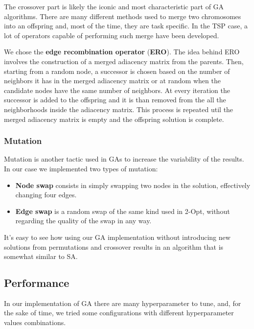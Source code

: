 The crossover part is likely the iconic and most characteristic part of GA algorithms.
There are many different methods used to merge two chromosomes into an offspring and, most of the time, they are task specific.
In the TSP case, a lot of operators capable of performing such merge have been developed.

We chose the \textbf{edge recombination operator} (\textbf{ERO}).
The idea behind ERO involves the construction of a merged adiacency matrix from the parents.
Then, starting from a random node, a successor is chosen based on the number of neighbors it has in the merged adiacency matrix or at random when the candidate nodes have the same number of neighbors.
At every iteration the successor is added to the offspring and it is than removed from the all the neighborhoods inside the adiacency matrix.
This process is repeated util the merged adiacency matrix is empty and the offspring solution is complete.

\subsubsection{Mutation}

Mutation is another tactic used in GAs to increase the variability of the results.
In our case we implemented two types of mutation:
\begin{itemize}
    \item \textbf{Node swap} consists in simply swapping two nodes in the solution, effectively changing four edges.
    \item \textbf{Edge swap} is a random swap of the same kind used in 2-Opt, without regarding the quality of the swap in any way.
\end{itemize}

It's easy to see how using our GA implementation without introducing new solutions from permutations and crossover results in an algorithm that is somewhat similar to SA.

\subsection{Performance}

In our implementation of GA there are many hyperparameter to tune, and, for the sake of time, we tried some configurations with different hyperparameter values combinations.

